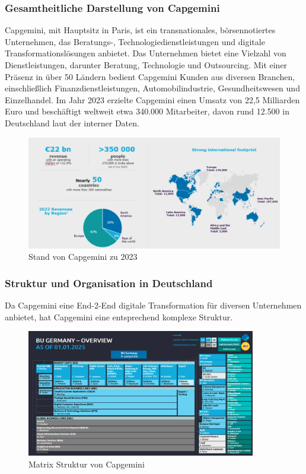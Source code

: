 \documentclass[a4paper, 12pt]{scrartcl}
\begin{document}
	\subsubsection{Gesamtheitliche Darstellung von Capgemini} %
Capgemini, mit Hauptsitz in Paris, ist ein transnationales, börsennotiertes Unternehmen, das Beratungs-, Technologiedienstleistungen und digitale Transformationslösungen anbietet. Das Unternehmen bietet eine Vielzahl von Dienstleistungen, darunter Beratung, Technologie und Outsourcing. Mit einer Präsenz in über 50 Ländern bedient Capgemini Kunden aus diversen Branchen, einschließlich Finanzdienstleistungen, Automobilindustrie, Gesundheitswesen und Einzelhandel. Im Jahr 2023 erzielte Capgemini einen Umsatz von 22,5 Milliarden Euro und beschäftigt weltweit etwa 340.000 Mitarbeiter, davon rund 12.500 in Deutschland laut der interner Daten.
	\begin{figure}[h]
		\begin{center}
			\includegraphics[width=12cm]{CApgemini zahlen.png}
			\caption{Stand von Capgemini zu 2023}
			\label{Stand von Capgemini}
		\end{center}
	\end{figure}
	\subsubsection{Struktur und Organisation in Deutschland}
Da Capgemini eine End-2-End digitale Transformation für diversen Unternehmen anbietet, hat Capgemini eine entsprechend komplexe Struktur. 
	\begin{figure}[h]
	\begin{center}
		\includegraphics[width=10cm]{BU Germany CAP.png}
		\caption{Matrix Struktur von Capgemini}
		\label{Matrix Struktur}
	\end{center}
\end{figure}
	\newpage
\end{document}
